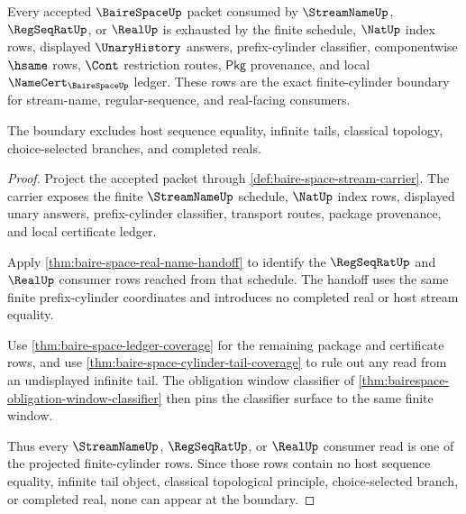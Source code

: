 \begin{theorem}
\label{thm:baire-space-finite-cylinder-stream-boundary}
Every accepted $\BaireSpaceUp$ packet consumed by $\StreamNameUp$,
$\RegSeqRatUp$, or $\RealUp$ is exhausted by the finite schedule, $\NatUp$
index rows, displayed $\UnaryHistory$ answers, prefix-cylinder classifier,
componentwise $\hsame$ rows, $\Cont$ restriction routes, $\mathsf{Pkg}$
provenance, and local $\NameCert_{\BaireSpaceUp}$ ledger. These rows are the
exact finite-cylinder boundary for stream-name, regular-sequence, and
real-facing consumers.

The boundary excludes host sequence equality, infinite tails, classical
topology, choice-selected branches, and completed reals.
\end{theorem}
\begin{proof}
Project the accepted packet through
\autoref{def:baire-space-stream-carrier}. The carrier exposes the finite
$\StreamNameUp$ schedule, $\NatUp$ index rows, displayed unary answers,
prefix-cylinder classifier, transport routes, package provenance, and local
certificate ledger.

Apply \autoref{thm:baire-space-real-name-handoff} to identify the
$\RegSeqRatUp$ and $\RealUp$ consumer rows reached from that schedule. The
handoff uses the same finite prefix-cylinder coordinates and introduces no
completed real or host stream equality.

Use \autoref{thm:baire-space-ledger-coverage} for the remaining package and
certificate rows, and use
\autoref{thm:baire-space-cylinder-tail-coverage} to rule out any read from an
undisplayed infinite tail. The obligation window classifier of
\autoref{thm:bairespace-obligation-window-classifier} then pins the classifier
surface to the same finite window.

Thus every $\StreamNameUp$, $\RegSeqRatUp$, or $\RealUp$ consumer read is one
of the projected finite-cylinder rows. Since those rows contain no host
sequence equality, infinite tail object, classical topological principle,
choice-selected branch, or completed real, none can appear at the boundary.
\end{proof}


